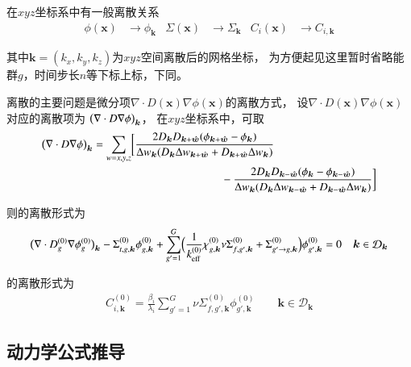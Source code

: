 在$xyz$坐标系中有一般离散关系
\begin{align}
  \phi(\bm{x}) &\rightarrow \phi_{\bm{k}} &
  \Sigma(\bm{x}) &\rightarrow \Sigma_{\bm{k}} &
  C_i(\bm{x}) &\rightarrow C_{i,\bm{k}}
\end{align}

其中$\bm{k}=(k_x,k_y,k_z)$为$xyz$空间离散后的网格坐标，
为方便起见这里暂时省略能群$g$，时间步长$n$等下标上标，下同。

离散的主要问题是微分项$\nabla\cdot D(\bm{x})\nabla\phi(\bm{x})$的离散方式，
设$\nabla\cdot D(\bm{x})\nabla\phi(\bm{x})$对应的离散项为
$\pb[b]{\nabla\cdot D\nabla\phi}_{\bm{k}}$，
在$xyz$坐标系中，可取
\begin{align}
  \begin{aligned}
  \pb[b]{\nabla\cdot D\nabla\phi}_{\bm{k}}
    &=\sum_{w=x,y,z} \Sb[bg]{
      \frac{2D_{\bm{k}}D_{\bm{k}+\hat{\bm{w}}}\pb{\phi_{\bm{k}+\hat{\bm{w}}} - \phi_{\bm{k}}}}
           {\Delta w_{\bm{k}}\pb{D_{\bm{k}}\Delta w_{\bm{k}+\hat{\bm{w}}}+D_{\bm{k}+\hat{\bm{w}}}\Delta w_{\bm{k}}}}
           \\
    &\hspace{4cm} -\frac{2D_{\bm{k}}D_{\bm{k}-\hat{\bm{w}}}\pb{\phi_{\bm{k}} - \phi_{\bm{k}-\hat{\bm{w}}}}}
           {\Delta w_{\bm{k}}\pb{D_{\bm{k}}\Delta w_{\bm{k}-\hat{\bm{w}}}+D_{\bm{k}-\hat{\bm{w}}}\Delta w_{\bm{k}}}}
     }
  \end{aligned}
  \label{equ:dnabla2.equ0}
\end{align}

则的离散形式为
\begin{align}
  \pb[b]{\nabla\cdot D_g^{(0)} \nabla\phi_g^{(0)}}_{\bm{k}}
   -\Sigma_{t,g,\bm{k}}^{(0)} \phi_{g,\bm{k}}^{(0)}
   +\sum_{g'=1}^G\pb[B]{\frac{1}{k_\mathrm{eff}^{(0)}}\chi_{g,\bm{k}}^{(0)} \nu\Sigma_{f,g',\bm{k}}^{(0)}
                        +\Sigma_{g'\rightarrow g,\bm{k}}^{(0)}}\phi_{g',\bm{k}}^{(0)} =0
  \quad \bm{k} \in \mathcal{D}_{\bm{k}}
\end{align}

的离散形式为
\begin{align}
  C_{i,\bm{k}}^{(0)} = \frac{\beta_i}{\lambda_i}
    \sum_{g'=1}^G \nu\Sigma_{f,g',\bm{k}}^{(0)}\phi_{g',\bm{k}}^{(0)}
  \qquad \bm{k} \in \mathcal{D}_{\bm{k}}
\end{align}

\subsection{动力学公式推导}

